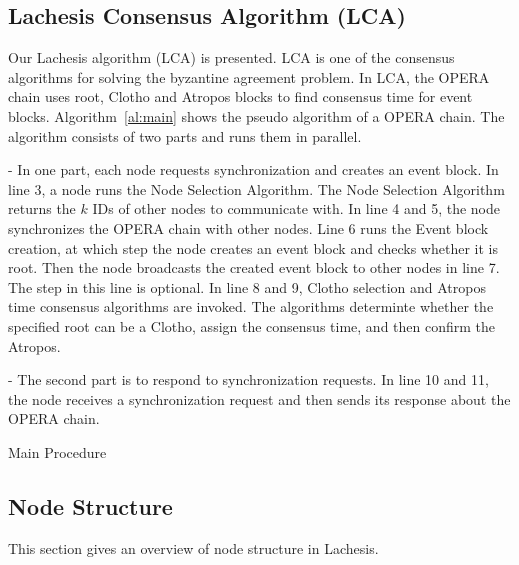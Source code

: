 \documentclass[preprint,12pt]{elsarticle}
\makeatletter
\def\BState{\State\hskip-\ALG@thistlm}
\makeatother
\begin{document}
\subsection{Lachesis Consensus Algorithm (LCA)} 

Our Lachesis algorithm (LCA) is presented. LCA is one of the consensus algorithms for solving the byzantine agreement problem. 
In LCA, the OPERA chain uses root, Clotho and Atropos blocks to find consensus time for event blocks. Algorithm~\ref{al:main} shows the pseudo algorithm of a OPERA chain. The algorithm consists of two parts and runs them in parallel.

- In one part, each node requests synchronization and creates an event block. In line 3, a node runs the Node Selection Algorithm. The Node Selection Algorithm returns the $k$ IDs of other nodes to communicate with. In line 4 and 5, the node synchronizes the OPERA chain with other nodes. Line 6 runs the Event block creation, at which step the node creates an event block and checks whether it is root. Then the node broadcasts the created event block to other nodes in line 7. The step in this line is optional. In line 8 and 9, Clotho selection and Atropos time consensus algorithms are invoked. The algorithms determinte whether the specified root can be a Clotho, assign the consensus time, and then confirm the Atropos. 

- The second part is to respond to synchronization requests. In line 10 and 11, the node receives a synchronization request and then sends its response about the OPERA chain.


\begin{algorithm}
\caption{Main Procedure}\label{al:main}
\end{algorithm}

\subsection{Node Structure}
This section gives an overview of node structure in Lachesis.
\end{document}
